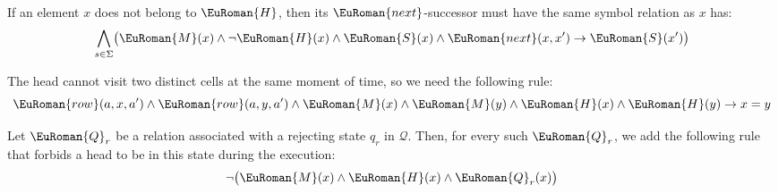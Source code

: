 \documentclass[10pt,a4paper]{amsart}
\theoremstyle{plain}
\theoremstyle{definition}
\numberwithin{equation}{section}
\newcommand{\eurm}[1]{\EuRoman{#1}} %
\newcommand{\euca}[1]{\mathcal{#1}} %
\newcommand{\rel}[1]{\eurm{#1}} %
\newcommand{\family}[1]{\euca{#1}} %
\begin{document}
If an element $x$ does not belong to $\rel{H}$, then its $\rel{next}$-successor must have the same symbol relation as $x$ has:
\begin{equation}\label{eq:symbol_propagate}
\bigwedge_{s\in\Sigma}\bigl(\rel{M}(x)\wedge\neg\rel{H}(x)\wedge\rel{S}(x)\wedge\rel{next}(x,x')\to\rel{S}(x')\bigr)
\end{equation}

The head cannot visit two distinct cells at the same moment of  time, so we need the following rule:
\begin{equation}\label{eq:head_unique}
\rel{row}(a,x,a')\wedge\rel{row}(a,y,a')\wedge\rel{M}(x)\wedge\rel{M}(y)\wedge\rel{H}(x)\wedge\rel{H}(y)\to x=y
\end{equation}


Let $\rel{Q}_r$ be a relation associated with a rejecting state $q_r$ in $\family{Q}$. Then, for every such $\rel{Q}_r$, we add the following rule that forbids a head to be in this state during the execution:
\begin{equation}\label{eq:rejecting_state}
\neg\bigl(\rel{M}(x)\wedge\rel{H}(x)\wedge\rel{Q}_r(x)\bigr)
\end{equation}
\end{document}
